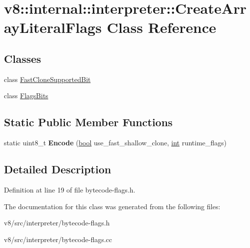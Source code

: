\hypertarget{classv8_1_1internal_1_1interpreter_1_1CreateArrayLiteralFlags}{}\section{v8\+:\+:internal\+:\+:interpreter\+:\+:Create\+Array\+Literal\+Flags Class Reference}
\label{classv8_1_1internal_1_1interpreter_1_1CreateArrayLiteralFlags}
\subsection*{Classes}
\begin{DoxyCompactItemize}
\item 
class \mbox{\hyperlink{classv8_1_1internal_1_1interpreter_1_1CreateArrayLiteralFlags_1_1FastCloneSupportedBit}{Fast\+Clone\+Supported\+Bit}}
\item 
class \mbox{\hyperlink{classv8_1_1internal_1_1interpreter_1_1CreateArrayLiteralFlags_1_1FlagsBits}{Flags\+Bits}}
\end{DoxyCompactItemize}
\subsection*{Static Public Member Functions}
\begin{DoxyCompactItemize}
\item 
\mbox{\label{classv8_1_1internal_1_1interpreter_1_1CreateArrayLiteralFlags_a3fae651c95277f494c5519662b09a97f}} 
static uint8\+\_\+t {\bfseries Encode} (\mbox{\hyperlink{classbool}{bool}} use\+\_\+fast\+\_\+shallow\+\_\+clone, \mbox{\hyperlink{classint}{int}} runtime\+\_\+flags)
\end{DoxyCompactItemize}


\subsection{Detailed Description}


Definition at line 19 of file bytecode-\/flags.\+h.



The documentation for this class was generated from the following files\+:\begin{DoxyCompactItemize}
\item 
v8/src/interpreter/bytecode-\/flags.\+h\item 
v8/src/interpreter/bytecode-\/flags.\+cc\end{DoxyCompactItemize}
